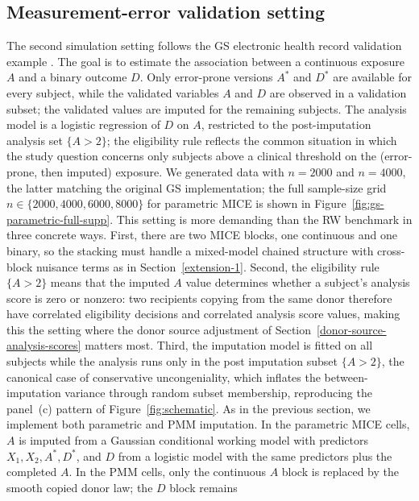 \subsection{Measurement-error validation setting}
\label{simulation-gs-setting}
The second simulation setting follows the GS electronic health record
validation example \citep{giganti2020multiple}.  The goal is to
estimate the association between a
continuous exposure \(A\) and a binary outcome \(D\).  Only error-prone
versions \(A^\ast\) and \(D^\ast\) are available for every subject, while
the validated variables \(A\) and \(D\) are observed in a validation
subset; the validated values are imputed for the remaining subjects.
The analysis model is a logistic regression of \(D\) on \(A\), restricted
to the post-imputation analysis set \(\{A>2\}\); the eligibility rule
reflects the common situation in which the study question concerns only
subjects above a clinical threshold on the (error-prone, then imputed)
exposure.  We generated data with \(n=2000\) and \(n=4000\), the latter matching the original GS implementation; the full sample-size grid \(n\in\{2000,4000,6000,8000\}\) for parametric MICE is shown in
Figure~\ref{fig:gs-parametric-full-supp}.
This setting is more demanding than the RW benchmark in three concrete
ways. First, there are two MICE blocks, one continuous and one binary,
so the stacking must handle a mixed-model chained structure with
cross-block nuisance terms as in
Section~\ref{extension-1}. Second, the eligibility rule \(\{A>2\}\)
means that the imputed \(A\) value determines whether a subject's
analysis score is zero or nonzero: two recipients copying from the same
donor therefore have correlated eligibility decisions and correlated
analysis score values, making this the setting where the donor source
adjustment of Section~\ref{donor-source-analysis-scores} matters most.
Third, the imputation model is fitted on all subjects while the analysis
runs only in the post imputation subset \(\{A>2\}\), the canonical
case of conservative uncongeniality, which inflates the between-imputation
variance through random subset membership, reproducing the panel~(c)
pattern of Figure~\ref{fig:schematic}.
As in the previous section, we implement both parametric and PMM
imputation.  In the parametric MICE cells, \(A\) is imputed from a Gaussian
conditional working model with predictors \(X_1,X_2,A^\ast,D^\ast\),
and \(D\) from a logistic model with the same predictors plus the
completed \(A\). In the PMM cells, only the continuous \(A\) block is
replaced by the smooth copied donor law; the \(D\) block remains
